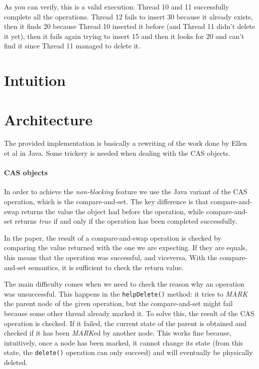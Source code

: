 \documentclass[a4paper,draft,12pt]{article}
\begin{document}
As you can verify, this is a valid execution: Thread 10 and 11 successfully complete all the operations. Thread 12 fails to insert 30 because it already exists, then it finds 20 because Thread 10 inserted it before (and Thread 11 didn't delete it yet), then it fails again trying to insert 15 and then it looks for 20 and can't find it since Thread 11 managed to delete it.

\section{Intuition}

\section{Architecture} %
\label{sec:architecture}
The provided implementation is basically a rewriting of the work done by Ellen et al in Java. Some trickery is needed when dealing with the \ac{CAS} objects.

\paragraph{CAS objects}
In order to achieve the \emph{non-blocking} feature we use the Java variant of the \ac{CAS} operation, which is the compare-and-set.
The key difference is that compare-and-swap returns the value the object had before the operation, while compare-and-set returns \emph{true} if and only if the operation has been completed successfully.

In the paper, the result of a compare-and-swap operation is checked by comparing the value returned with the one we are expecting. If they are equals, this means that the operation was successful, and viceversa.
With the compare-and-set semantics, it is sufficient to check the return value.

The main difficulty comes when we need to check the reason why an operation was unsuccessful.
This happens in the \texttt{helpDelete()} method: it tries to \emph{MARK} the parent node of the given operation, but the compare-and-set might fail because some other thread already marked it.
To solve this, the result of the \ac{CAS} operation is checked. If it failed, the current state of the parent is obtained and checked if it has been \emph{MARK}ed by another node.
This works fine because, intuitively, once a node has been marked, it cannot change its state (from this state, the \texttt{delete()} operation can only succeed) and will eventually be physically deleted.
\end{document}
